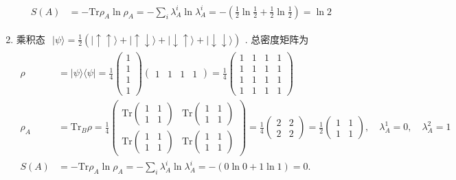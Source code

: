 \documentclass[../../main.tex]{subfiles}
\begin{document}
\begin{enumerate}
\begin{align*}
        S(A) &= -\text{Tr}\rho_{A}\ln{\rho_{A}} = - \sum_{i}\lambda_{A}^{i}\ln{\lambda_{A}^{i}} = -\left(\frac{1}{2}\ln{\frac{1}{2}} + \frac{1}{2}\ln{\frac{1}{2}}\right) = \ln{2}
    \end{align*}
    \item 乘积态 $\begin{aligned}
        |\psi\rangle = \frac{1}{2}(|\uparrow\uparrow\rangle + |\uparrow\downarrow\rangle + |\downarrow\uparrow\rangle + |\downarrow\downarrow\rangle)
    \end{aligned}$. 总密度矩阵为
    \begin{align*}
        \rho &= |\psi\rangle\langle\psi| = \frac{1}{4}\begin{pmatrix}
            1 \\ 1 \\ 1 \\ 1
        \end{pmatrix}\begin{pmatrix}
            1 & 1 & 1 & 1
        \end{pmatrix} = \frac{1}{4}\begin{pmatrix}
            1 & 1 & 1 & 1\\ 1 & 1 & 1 & 1\\ 1 & 1 & 1 & 1\\ 1 & 1 & 1 & 1
        \end{pmatrix}\\
        \rho_{A} &= \text{Tr}_{B}\rho = \frac{1}{4}\begin{pmatrix}
            \text{Tr}\begin{pmatrix}
                1 & 1 \\ 1 & 1
            \end{pmatrix} &  \text{Tr}\begin{pmatrix}
                1 & 1 \\ 1 & 1
            \end{pmatrix}\\
            \text{Tr}\begin{pmatrix}
                1 & 1 \\ 1 & 1
            \end{pmatrix} &  \text{Tr}\begin{pmatrix}
                1 & 1 \\ 1 & 1
            \end{pmatrix}
        \end{pmatrix} = \frac{1}{4}\begin{pmatrix}
            2 & 2 \\ 2 & 2
        \end{pmatrix} = \frac{1}{2}\begin{pmatrix}
            1 & 1 \\ 1 & 1
        \end{pmatrix},\quad \lambda_{A}^{1} = 0,\quad \lambda_{A}^{2} = 1\\
        S(A) &= -\text{Tr}\rho_{A}\ln{\rho_{A}} = -\sum_{i}\lambda_{A}^{i}\ln{\lambda_{A}^{i}} = - (0\ln{0} + 1\ln{1}) = 0.
    \end{align*}
\end{enumerate}
\end{document}
